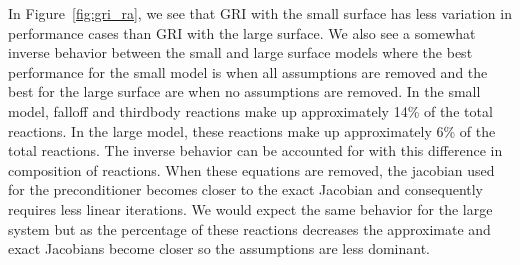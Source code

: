 \documentclass{article}
\begin{document}
In Figure~\ref{fig:gri_ra}, we see that GRI with the small surface has less variation in performance cases than GRI with the large surface.
We also see a somewhat inverse behavior between the small and large surface models where the best performance for the small model is when all assumptions are removed and the best for the large surface are when no assumptions are removed.
In the small model, falloff and thirdbody reactions make up approximately 14\% of the total reactions.
In the large model, these reactions make up approximately 6\% of the total reactions.
The inverse behavior can be accounted for with this difference in composition of reactions.
When these equations are removed, the jacobian used for the preconditioner becomes closer to the exact Jacobian and consequently requires less linear iterations.
We would expect the same behavior for the large system but as the percentage of these reactions decreases the approximate and exact Jacobians become closer so the assumptions are less dominant.
\end{document}
